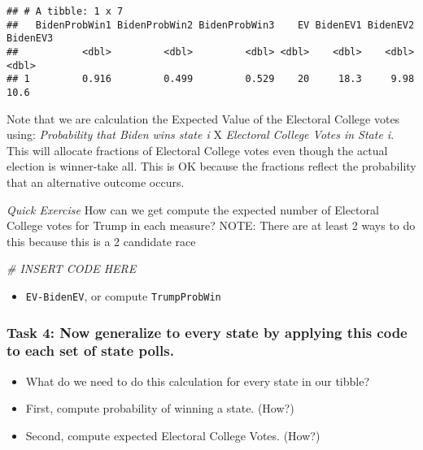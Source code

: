 \documentclass[
]{article}
\newenvironment{Shaded}{\begin{snugshade}}{\end{snugshade}}
\newcommand{\CommentTok}[1]{\textcolor[rgb]{0.56,0.35,0.01}{\textit{#1}}}
\providecommand{\tightlist}{%
  \setlength{\itemsep}{0pt}\setlength{\parskip}{0pt}}
\begin{document}
\begin{verbatim}
## # A tibble: 1 x 7
##   BidenProbWin1 BidenProbWin2 BidenProbWin3    EV BidenEV1 BidenEV2 BidenEV3
##           <dbl>         <dbl>         <dbl> <dbl>    <dbl>    <dbl>    <dbl>
## 1         0.916         0.499         0.529    20     18.3     9.98     10.6
\end{verbatim}

Note that we are calculation the Expected Value of the Electoral College
votes using: \emph{Probability that Biden wins state i} X
\emph{Electoral College Votes in State i}. This will allocate fractions
of Electoral College votes even though the actual election is
winner-take all. This is OK because the fractions reflect the
probability that an alternative outcome occurs.

\emph{Quick Exercise} How can we get compute the expected number of
Electoral College votes for Trump in each measure? NOTE: There are at
least 2 ways to do this because this is a 2 candidate race

\begin{Shaded}
\begin{Highlighting}[]
\CommentTok{\# INSERT CODE HERE}
\end{Highlighting}
\end{Shaded}

\begin{itemize}
\tightlist
\item
  \texttt{EV-BidenEV}, or compute \texttt{TrumpProbWin}
\end{itemize}

\subsubsection{Task 4: Now generalize to every state by applying this
code to each set of state
polls.}\label{task-4-now-generalize-to-every-state-by-applying-this-code-to-each-set-of-state-polls.}

\begin{itemize}
\tightlist
\item
  What do we need to do this calculation for every state in our tibble?
\item
  First, compute probability of winning a state. (How?)
\item
  Second, compute expected Electoral College Votes. (How?)
\end{itemize}
\end{document}
